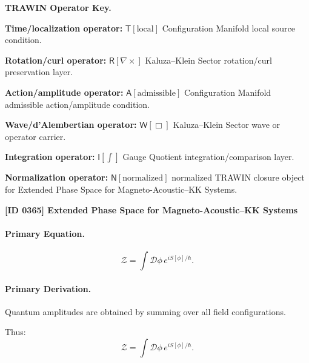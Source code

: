 \par\vspace{0.45\baselineskip}
\noindent\begin{minipage}[t]{\linewidth}
\begingroup
\small
\raggedright
\textbf{TRAWIN Operator Key.}\par
\noindent\textbf{Time/localization operator:} $\mathsf{T}\!\left[\mathrm{local}\right]$ Configuration Manifold local source condition.\par
\noindent\textbf{Rotation/curl operator:} $\mathsf{R}\!\left[\nabla\times\right]$ Kaluza--Klein Sector rotation/curl preservation layer.\par
\noindent\textbf{Action/amplitude operator:} $\mathsf{A}\!\left[\mathrm{admissible}\right]$ Configuration Manifold admissible action/amplitude condition.\par
\noindent\textbf{Wave/d'Alembertian operator:} $\mathsf{W}\!\left[\Box\right]$ Kaluza--Klein Sector wave or operator carrier.\par
\noindent\textbf{Integration operator:} $\mathsf{I}\!\left[\int\right]$ Gauge Quotient integration/comparison layer.\par
\noindent\textbf{Normalization operator:} $\mathsf{N}\!\left[\mathrm{normalized}\right]$ normalized TRAWIN closure object for Extended Phase Space for Magneto-Acoustic--KK Systems.\par
\endgroup
\end{minipage}

\clearpage
\noindent\textbf{[ID 0365] Extended Phase Space for Magneto-Acoustic--KK Systems}\par
\vspace{0.35em}
\paragraph{Primary Equation.}
\begin{equation}
\mathcal{Z}
=
\int \mathcal{D}\phi \, e^{iS[\phi]/\hbar}.
\end{equation}

\paragraph{Primary Derivation.}
Quantum amplitudes are obtained by summing over all field configurations.

Thus:
\begin{equation}
\boxed{
\mathcal{Z}
=
\int \mathcal{D}\phi \, e^{iS[\phi]/\hbar}.
}
\end{equation}

